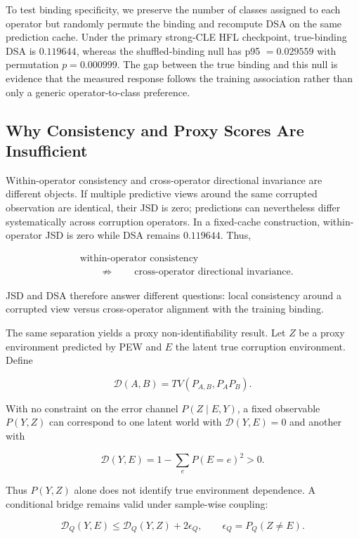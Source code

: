 To test binding specificity, we preserve the number of classes assigned to each operator but randomly permute the binding and recompute DSA on the same prediction cache. Under the primary strong-CLE HFL checkpoint, true-binding DSA is \(0.119644\), whereas the shuffled-binding null has p95 \(=0.029559\) with permutation \(p=0.000999\). The gap between the true binding and this null is evidence that the measured response follows the training association rather than only a generic operator-to-class preference.

\subsection{Why Consistency and Proxy Scores Are Insufficient}

Within-operator consistency and cross-operator directional invariance are different objects. If multiple predictive views around the same corrupted observation are identical, their JSD is zero; predictions can nevertheless differ systematically across corruption operators. In a fixed-cache construction, within-operator JSD is zero while DSA remains \(0.119644\). Thus,

\[
\begin{aligned}
&\text{within-operator consistency}\\
&\qquad\not\Rightarrow\qquad
\text{cross-operator directional invariance}.
\end{aligned}
\]

JSD and DSA therefore answer different questions: local consistency around a corrupted view versus cross-operator alignment with the training binding.

The same separation yields a proxy non-identifiability result. Let \(Z\) be a proxy environment predicted by PEW and \(E\) the latent true corruption environment. Define

\[
\mathcal D(A,B)=TV(P_{A,B},P_AP_B).
\]

With no constraint on the error channel \(P(Z\mid E,Y)\), a fixed observable \(P(Y,Z)\) can correspond to one latent world with \(\mathcal D(Y,E)=0\) and another with

\[
\mathcal D(Y,E)=1-\sum_eP(E=e)^2>0.
\]

Thus \(P(Y,Z)\) alone does not identify true environment dependence. A conditional bridge remains valid under sample-wise coupling:

\[
\mathcal D_Q(Y,E)\le
\mathcal D_Q(Y,Z)+2\epsilon_Q,
\qquad
\epsilon_Q=P_Q(Z\neq E).
\]

